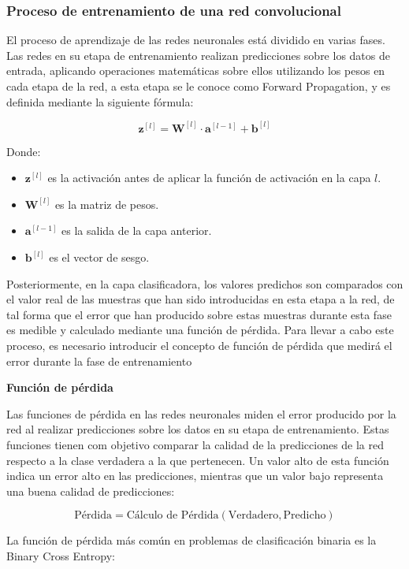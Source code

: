 \documentclass{uathesis-es}
\begin{document}
\subsubsection*{Proceso de entrenamiento de una red convolucional}

El proceso de aprendizaje de las redes neuronales está dividido en varias fases. Las redes en su etapa de entrenamiento realizan predicciones sobre los datos de entrada, aplicando operaciones matemáticas sobre ellos utilizando los pesos en cada etapa de la red, a esta etapa se le conoce como Forward Propagation, y es definida mediante la siguiente fórmula:


\[
\mathbf{z}^{[l]} = \mathbf{W}^{[l]} \cdot \mathbf{a}^{[l-1]} + \mathbf{b}^{[l]}
\]

Donde:
\begin{itemize}
	\item \(\mathbf{z}^{[l]}\) es la activación antes de aplicar la función de activación en la capa \(l\).
	\item \(\mathbf{W}^{[l]}\) es la matriz de pesos.
	\item \(\mathbf{a}^{[l-1]}\) es la salida de la capa anterior.
	\item \(\mathbf{b}^{[l]}\) es el vector de sesgo.
\end{itemize}

Posteriormente, en la capa clasificadora, los valores predichos son comparados con el valor real de las muestras que han sido introducidas en esta etapa a la red, de tal forma que el error que han producido sobre estas muestras durante esta fase es medible y calculado mediante una función de pérdida. Para llevar a cabo este proceso, es necesario introducir el concepto de función de pérdida que medirá el error durante la fase de entrenamiento


\textbf{Función de pérdida}

Las funciones de pérdida en las redes neuronales miden el error producido por la red al realizar predicciones sobre los datos en su etapa de entrenamiento. Estas funciones tienen com objetivo comparar la calidad de la predicciones de la red respecto a la clase verdadera a la que pertenecen. Un valor alto de esta función indica un error alto en las predicciones, mientras que un valor bajo representa una buena calidad de predicciones:

\[
\text{Pérdida} = \text{Cálculo de Pérdida} (\text{Verdadero}, \text{Predicho})
\]

La función de pérdida más común en problemas de clasificación binaria es la Binary Cross Entropy:
\end{document}
